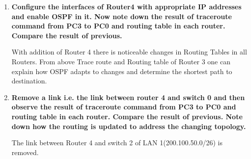 \documentclass[a4paper,11pt]{article}
\begin{document}
\begin{enumerate}

    \item \textbf{Configure the interfaces of Router4 with appropriate IP addresses and enable OSPF in it.
              Now note down the result of traceroute command from PC3 to PC0 and routing table in
              each router. Compare the result of previous.}












          With addition of Router 4 there is noticeable changes in Routing Tables in all Routers.
          From above Trace route and Routing table of Router 3 one can explain how OSPF adapts to changes and determine the shortest path to destination.


    \item \textbf{Remove a link i.e. the link between router 4 and switch 0 and then observe the result of
              traceroute command from PC3 to PC0 and routing table in each router. Compare the result
              of previous. Note down how the routing is updated to address the changing topology.}



          The link between Router 4 and switch 2 of LAN 1(200.100.50.0/26) is removed.



\end{enumerate}
\end{document}
